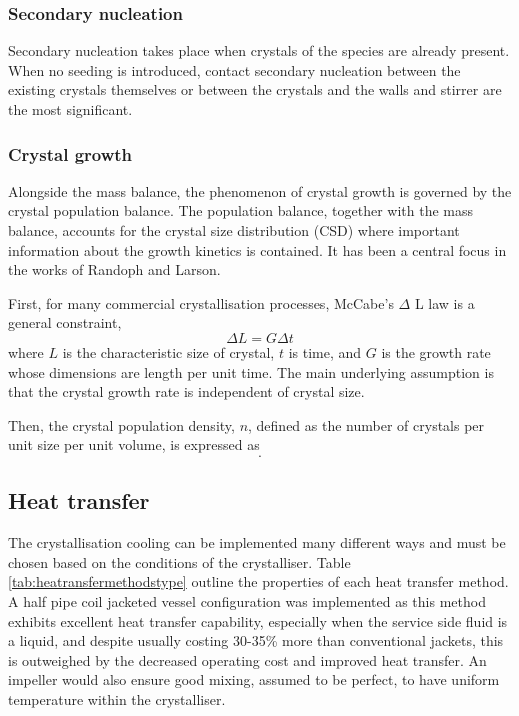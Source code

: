 \subsubsection{Secondary nucleation}

Secondary nucleation takes place when crystals of the species are already present. \cite{richardson} When no seeding is introduced, contact secondary nucleation between the existing crystals themselves or between the crystals and the walls and stirrer are the most significant. 

\subsubsection{Crystal growth}

Alongside the mass balance, the phenomenon of crystal growth is governed by the crystal population balance. The population balance, together with the mass balance, accounts for the crystal size distribution (CSD) where important information about the growth kinetics is contained. It has been a central focus in the works of Randoph and Larson. \cite{randolph larson}

First, for many commercial crystallisation processes, McCabe's $\Delta$ L law is a general constraint,
\begin{equation} \label{eq: McCabe deltaL}
    \Delta L = G \Delta t
\end{equation}
where $L$ is the characteristic size of crystal, $t$ is time, and $G$ is the growth rate whose dimensions are length per unit time. The main underlying assumption is that the crystal growth rate is independent of crystal size. 

Then, the crystal population density, $n$, defined as the number of crystals per unit size per unit volume, is expressed as 
\begin{equation} \label{eq:crystal population density definition}
    .
\end{equation}






\subsection{Heat transfer}

The crystallisation cooling can be implemented many different ways and must be chosen based on the conditions of the crystalliser. Table \ref{tab:heatransfermethodstype} outline the properties of each heat transfer method. A half pipe coil jacketed vessel configuration was implemented as this method exhibits excellent heat transfer capability, especially when the service side fluid is a liquid, and despite usually costing 30-35\% more than conventional jackets, this is outweighed by the decreased operating cost and improved heat transfer. An impeller would also ensure good mixing, assumed to be perfect, to have uniform temperature within the crystalliser. 

